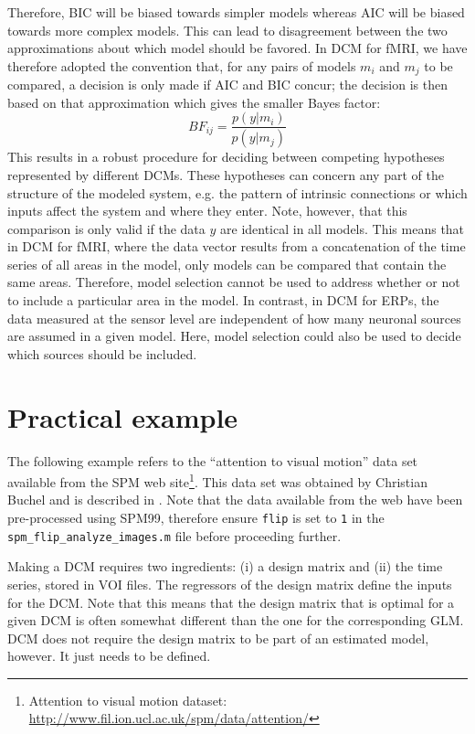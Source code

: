Therefore, BIC will be biased towards simpler models whereas AIC will be biased towards more complex models. This can lead to disagreement between the two approximations about which model should be favored. In DCM for fMRI, we have therefore adopted the convention that, for any pairs of models $m_i$ and $m_j$ to be compared, a decision is only made if AIC and BIC concur; the decision is then based on that approximation which gives the smaller Bayes factor:
\begin{equation}
BF_{ij} = \frac{p(y|m_i)}{p(y|m_j)}
\end{equation}
This results in a robust procedure for deciding between competing hypotheses represented by different DCMs. These hypotheses can concern any part of the structure of the modeled system, e.g. the pattern of intrinsic connections or which inputs affect the system and where they enter. Note, however, that this comparison is only valid if the data $y$ are identical in all models.  This means that in DCM for fMRI, where the data vector results from a concatenation of the time series of all areas in the model, only models can be compared that contain the same areas. Therefore, model selection cannot be used to address whether or not to include a particular area in the model.  In contrast, in DCM for ERPs, the data measured at the sensor level are independent of how many neuronal sources are assumed in a given model.  Here, model selection could also be used to decide which sources should be included.

\section{Practical example}

The following example refers to the ``attention to visual motion'' data set available from the SPM web site\footnote{Attention to visual motion dataset: \url{http://www.fil.ion.ucl.ac.uk/spm/data/attention/}}. This data set was obtained by Christian Buchel and is described in \cite{buchel97}.  Note that the data available from the web have been pre-processed using SPM99, therefore ensure \texttt{flip} is set to \texttt{1} in the \texttt{spm\_flip\_analyze\_images.m} file before proceeding further.

Making a DCM requires two ingredients: (i) a design matrix and (ii) the time series, stored in VOI files.  The regressors of the design matrix define the inputs for the DCM.  Note that this means that the design matrix that is optimal for a given DCM is often somewhat different than the one for the corresponding GLM. DCM does not require the design matrix to be part of an estimated model, however. It just needs to be defined.

